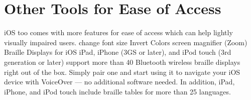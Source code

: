 \section{Other Tools for Ease of Access}
iOS too comes with more features for ease of access which can help lightly visually impaired users.
change font size 
Invert Colors
screen magnifier (Zoom)
Braille Displays for iOS
iPad, iPhone (3GS or later), and iPod touch (3rd generation or later) support more than 40 Bluetooth wireless braille displays right out of the box. Simply pair one and start using it to navigate your iOS device with VoiceOver — no additional software needed. In addition, iPad, iPhone, and iPod touch include braille tables for more than 25 languages.

\endinput